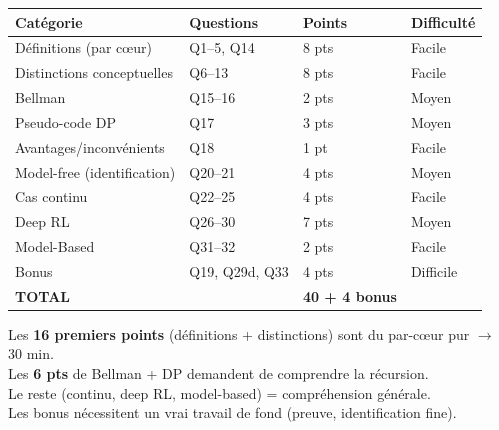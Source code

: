 \documentclass[11pt,a4paper]{article}
\begin{document}
\begin{center}
\renewcommand{\arraystretch}{1.3}
\begin{tabular}{l l l l}
\toprule
\textbf{Catégorie} & \textbf{Questions} & \textbf{Points} & \textbf{Difficulté} \\
\midrule
Définitions (par c\oe{}ur) & Q1--5, Q14 & 8 pts & Facile \\
Distinctions conceptuelles & Q6--13 & 8 pts & Facile \\
Bellman & Q15--16 & 2 pts & Moyen \\
Pseudo-code DP & Q17 & 3 pts & Moyen \\
Avantages/inconvénients & Q18 & 1 pt & Facile \\
Model-free (identification) & Q20--21 & 4 pts & Moyen \\
Cas continu & Q22--25 & 4 pts & Facile \\
Deep RL & Q26--30 & 7 pts & Moyen \\
Model-Based & Q31--32 & 2 pts & Facile \\
Bonus & Q19, Q29d, Q33 & 4 pts & Difficile \\
\midrule
\textbf{TOTAL} & & \textbf{40 + 4 bonus} & \\
\bottomrule
\end{tabular}
\end{center}

\begin{tipbox}
Les \textbf{16 premiers points} (définitions + distinctions) sont du par-c\oe{}ur pur $\to$ 30 min.\\
Les \textbf{6 pts} de Bellman + DP demandent de comprendre la récursion.\\
Le reste (continu, deep RL, model-based) = compréhension générale.\\
Les bonus nécessitent un vrai travail de fond (preuve, identification fine).
\end{tipbox}
\end{document}

